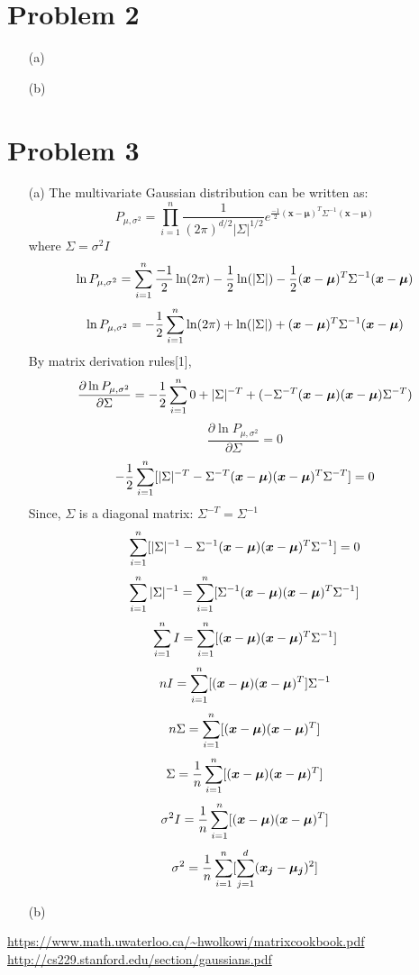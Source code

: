 \documentclass[fleqn]{article}
\begin{document}
\section{Problem 2}{}
\begin{itemize}
	\item[(a)] 
        \item[(b)] 
\end{itemize}
\section{Problem 3}{}
\begin{itemize}
        \item[(a)]
		The multivariate Gaussian distribution can be written as:
		\[
			P_{\mu, \sigma^2} = \prod_{i = 1}^{n} \frac{1}{(2 \pi)^{d/2} |\Sigma|^{1/2}} e^{\frac{-1}{2} (\bm{x} - \bm{\mu})^T \Sigma^{-1} (\bm{x} - \bm{\mu}) }
		\]
		where $\Sigma = \sigma^2 I$
		\[
			\ln P_{\mu, \sigma^2} = 
			\smashoperator{\sum_{i = 1}^{n}} 
				\frac{-1}{2} \ln(2\pi) 
				- \frac{1}{2} \ln(|\Sigma|) 
				- \frac{1}{2} (\bm{x} - \bm{\mu})^T \Sigma^{-1} (\bm{x} - \bm{\mu})
		\]
		\[
			\ln P_{\mu, \sigma^2} = 
			- \frac{1}{2} \smashoperator{\sum_{i = 1}^{n}} 
				\ln(2\pi) 
				+ \ln(|\Sigma|) 
				+ (\bm{x} - \bm{\mu})^T \Sigma^{-1} (\bm{x} - \bm{\mu})
		\]
		By matrix derivation rules[1],
		\[
			\frac{\partial \ln P_{\mu, \sigma^2}}{\partial \Sigma} = 
			- \frac{1}{2} \smashoperator{\sum_{i = 1}^{n}} 
				0 + |\Sigma|^{-T} 
				+ (- \Sigma^{-T}(\bm{x} - \bm{\mu}) (\bm{x} - \bm{\mu}) \Sigma^{-T})
		\]
		\[
			\frac{\partial \ln P_{\mu, \sigma^2}}{\partial \Sigma} = 0
		\]
		\[
			- \frac{1}{2} \smashoperator{\sum_{i = 1}^{n}} 
			[ |\Sigma|^{-T} 
			- \Sigma^{-T}(\bm{x} - \bm{\mu}) (\bm{x} - \bm{\mu})^T \Sigma^{-T} ]
			= 0
		\]
		Since, $\Sigma$ is a diagonal matrix: $\Sigma^{-T} = \Sigma^{-1}$
		\[
			\smashoperator{\sum_{i = 1}^{n}} 
			[ |\Sigma|^{-1} 
			- \Sigma^{-1}(\bm{x} - \bm{\mu}) (\bm{x} - \bm{\mu})^T \Sigma^{-1} ]
			= 0
		\]
		\[
			\smashoperator{\sum_{i = 1}^{n}} |\Sigma|^{-1} =
			\smashoperator{\sum_{i = 1}^{n}} 
			[ \Sigma^{-1}(\bm{x} - \bm{\mu}) (\bm{x} - \bm{\mu})^T \Sigma^{-1} ]
		\]
		\[
			\smashoperator{\sum_{i = 1}^{n}} I =
			\smashoperator{\sum_{i = 1}^{n}} 
			[ (\bm{x} - \bm{\mu}) (\bm{x} - \bm{\mu})^T \Sigma^{-1} ]
		\]
		\[
			nI =
			\smashoperator{\sum_{i = 1}^{n}} [ (\bm{x} - \bm{\mu}) (\bm{x} - \bm{\mu})^T] \Sigma^{-1}
		\]
		\[
			n\Sigma =
			\smashoperator{\sum_{i = 1}^{n}} [ (\bm{x} - \bm{\mu}) (\bm{x} - \bm{\mu})^T ]
		\]
		\[
			\Sigma = \frac{1}{n} \smashoperator{\sum_{i = 1}^{n}} [ (\bm{x} - \bm{\mu}) (\bm{x} - \bm{\mu})^T ]
		\]
		\[
			\sigma^2 I = \frac{1}{n} \smashoperator{\sum_{i = 1}^{n}} [ (\bm{x} - \bm{\mu}) (\bm{x} - \bm{\mu})^T ]
		\]
 		\[
			\sigma^2 = \frac{1}{n} \smashoperator{\sum_{i = 1}^{n}} [\smashoperator{\sum_{j = 1}^{d}} (\bm{x_j} - \bm{\mu_j})^2]
		\]
        \item[(b)]
\end{itemize}

\begin{thebibliography}{99}
        \bibitem{[1]} \url{https://www.math.uwaterloo.ca/~hwolkowi/matrixcookbook.pdf}
        \bibitem{[2]} \url{http://cs229.stanford.edu/section/gaussians.pdf}

\end{thebibliography}
\end{document}
